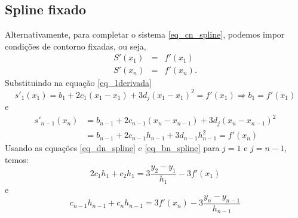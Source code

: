 \subsection{Spline fixado}

Alternativamente, para completar o sistema \eqref{eq_cn_spline}, podemos impor condições de contorno fixadas, ou seja,
\begin{eqnarray*}
S'(x_1)&=&f'(x_1)\\
S'(x_n)&=&f'(x_n).
\end{eqnarray*}
Substituindo na equação \eqref{eq_1derivada}
\begin{equation}
s'_1(x_1)=b_1+2c_1(x_1-x_1)+3d_j(x_1-x_1)^2=f'(x_1)\Longrightarrow b_1=f'(x_1)  
\end{equation}
e
\begin{equation}
  \begin{split}
s'_{n-1}(x_n) &= b_{n-1}+2c_{n-1}(x_n-x_{n-1})+3d_j(x_n-x_{n-1})^2 \\
&= b_{n-1}+2c_{n-1}h_{n-1}+3d_{n-1}h_{n-1}^2=f'(x_n)
  \end{split}
\end{equation}
Usando as equações \eqref{eq_dn_spline} e \eqref{eq_bn_spline} para $j=1$ e $j=n-1$, temos:
\begin{equation}
2c_1h_1+c_{2}h_1=3\frac{y_{2}-y_1}{h_1}-3f'(x_1)  
\end{equation}
e
\begin{equation}
c_{n-1}h_{n-1}+c_{n}h_{n-1}=3f'(x_n)-3\frac{y_{n}-y_{n-1}}{h_{n-1}}  
\end{equation}


